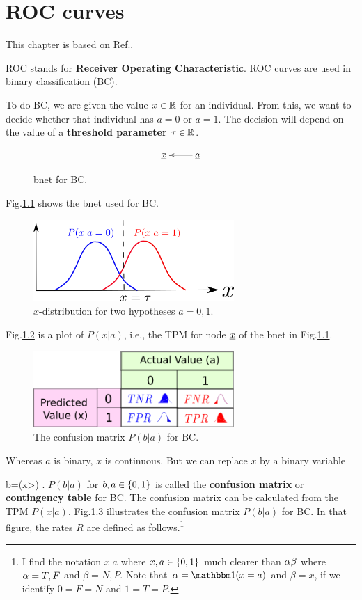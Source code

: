 \chapter{ROC curves}
This chapter is based on Ref.\cite{wiki-roc}.

ROC stands for
{\bf  Receiver Operating Characteristic}.
ROC curves are used in binary
classification (BC).

To do BC, we are given the value
$x\in{ \mathbb{R}}$
for an individual. From this, 
we want to decide
whether that
individual 
has $a=0$
or $a=1$.
The decision will
depend on the
value
of a
{\bf threshold parameter $\tau\in { \mathbb{R}}$}.


\begin{figure}[h!]
$$\xymatrix{
\rvx&\rva\ar[l]
}$$
\caption{bnet for 
BC.}
\label{fig-roc-bnet}
\end{figure}
Fig.\ref{fig-roc-bnet}
shows the bnet used for BC.


\begin{figure}[h!]
\centering
\includegraphics[width=3in]
{roc/bell-curves.png}
\caption{$x$-distribution for
two hypotheses $a=0,1$. } 
\label{fig-bell-curves}
\end{figure}
Fig.\ref{fig-bell-curves}
is a 
plot
of $P(x|a)$, i.e., the TPM 
for node ${\underline{x}}$
of the bnet in Fig.\ref{fig-roc-bnet}.


\begin{figure}[h!]
\centering
\includegraphics[width=3in]
{roc/confusion-mat.png}
\caption{The confusion matrix 
$P(b|a)$
for BC.} 
\label{fig-confusion-mat}
\end{figure}

Whereas $a$
is binary, $x$
is continuous. 
But we can replace
$x$ by a binary variable

\beq
b=\indi(x>\tau)
\;.
\eeq
$P(b|a)$
for $b, a\in\{0,1\}$
is called the
{\bf confusion matrix}
or {\bf contingency table}
for BC.
The confusion
matrix can be
calculated from
the TPM $P(x|a)$.
Fig.\ref{fig-confusion-mat}
illustrates the
confusion matrix
$P(b|a)$
for BC.
In that
figure,
the rates $R$
are defined as
follows.\footnote{
I find the notation 
$x|a$ where $x,a\in \{0,1\}$
much clearer than $\alpha\beta$
where $\alpha=T,F$ and 
$\beta=N,P$.
Note that $\alp=\indi(x=a)$
and $\beta=x$,
if we identify $0=F=N$
and $1=T=P$.}

